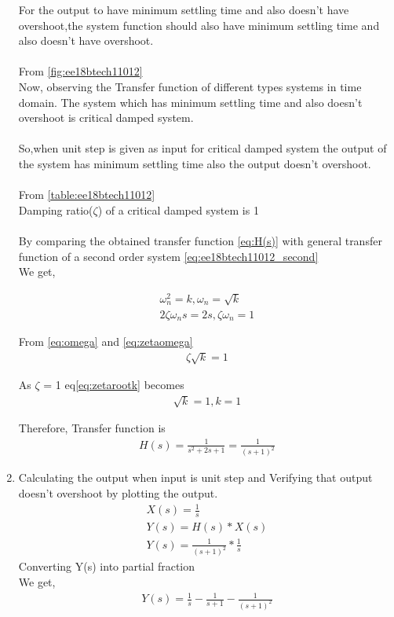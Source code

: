 \begin{enumerate}[label=\thesection.\arabic*.,ref=\thesection.\theenumi]
For the output to have minimum settling time and also doesn't have overshoot,the system function should also have minimum settling time and also doesn't have overshoot.\\
\\
From \eqref{fig:ee18btech11012}\\
Now, observing the Transfer function of different types systems in time domain. The system which has minimum settling time and also doesn't overshoot is critical damped system.\\
\\
So,when unit step is given as input for critical damped system the output of the system has minimum settling time also the output doesn't overshoot.\\
\\
From \eqref{table:ee18btech11012}\\
Damping ratio(\(\zeta \)) of a critical damped system is 1\\
\\
By comparing the obtained transfer function \eqref{eq:H(s)} with general transfer function of a second order system \eqref{eq:ee18btech11012_second}\\
We get,

\begin{align}
\label{eq:omega}
\omega_n^2 = k,\omega_n = \sqrt{k}\\
\label{eq:zetaomega}
2\zeta\omega_ns = 2s,\zeta\omega_n = 1
\end{align}

From \eqref{eq:omega} and \eqref{eq:zetaomega} \\
\begin{align}
\zeta\sqrt{k} = 1
\label{eq:zetarootk}
\end{align}

As \(\zeta\) = 1  eq\eqref{eq:zetarootk} becomes 
\begin{align}
\sqrt{k} = 1,k = 1
\end{align}

Therefore, Transfer function is 
\begin{align}
H(s) = \frac{1}{s^2+2s+1} = \frac{1}{(s+1)^2}
\end{align}

\item Calculating the output when input is unit step and Verifying that output doesn't overshoot by plotting the output.\\
\solution 
\begin{align}
X(s) = \frac{1}{s}\\
Y(s) = H(s)*X(s)\\
Y(s) = \frac{1}{(s+1)^2}*\frac{1}{s}
\end{align}
Converting Y(s) into partial fraction\\
We get,
\begin{align}
Y(s) = \frac{1}{s}-\frac{1}{s+1}-\frac{1}{(s+1)^2}
\label{Y(s)}
\end{align}


\end{enumerate}
